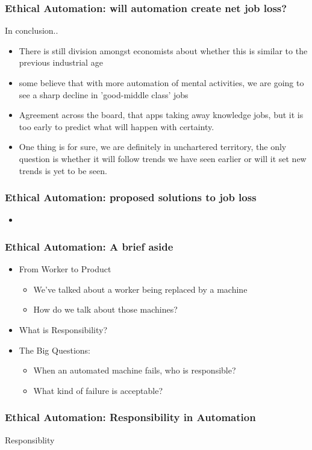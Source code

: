\begin{frame}
	\frametitle{Ethical Automation: will automation create net job loss? }
	{\Large In conclusion..}
	\begin{itemize}
	\item There is still division amongst economists about whether this is similar to the previous industrial age
	\item some believe that with more automation of mental activities, we are going to see a sharp decline in 'good-middle class' jobs
	\item Agreement across the board, that apps taking away knowledge jobs, but it is too early to predict what will happen with certainty.
	\item One thing is for sure, we are definitely in unchartered territory, the only question is whether it will follow trends we have seen earlier or will it set new trends is yet to be seen.
	\end{itemize}
\end{frame}


\begin{frame}
	\frametitle{ Ethical Automation: proposed solutions to job loss}
	\begin{itemize}
		\item
	\end{itemize}
\end{frame}

\begin{frame}
	\frametitle{ Ethical Automation: A brief aside}
	\begin{itemize}
		\item From Worker to Product
		\begin{itemize}
			\item We've talked about a worker being replaced by a machine
			\item How do we talk about those machines?
		\end{itemize}
		\item What is Responsibility?
		\item The Big Questions:
		\begin{itemize}
			\item When an automated machine fails, who is responsible?
			\item What kind of failure is acceptable?
		\end{itemize}
	\end{itemize}
\end{frame}


\begin{frame}
	\frametitle{ Ethical Automation: Responsibility in Automation}
	\Large{Responsiblity}
\end{frame}


